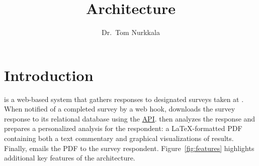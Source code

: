 \documentclass{article}
\title{\caper{} Architecture}
\author{Dr.\ Tom Nurkkala}
\begin{document}
\maketitle
\tableofcontents

\section{Introduction}
\label{sec:introduction}

\caper{} is a web-based system
that gathers responses to designated surveys taken at {\qual}.
When notified of a completed survey by a \qual{} web hook,
\caper{}
downloads the survey response
to its \pg{} relational database
using the
\qual{} \href{https://api.qualtrics.com/}{\rest{} API}.
\caper{} then
analyzes the response and
prepares a personalized analysis for the respondent:
a \LaTeX-formatted PDF containing both a text commentary
and graphical visualizations of results.
Finally, \caper{}
emails the PDF to the survey respondent.
Figure~\ref{fig:features} highlights additional
key features of the \caper{} architecture.
\end{document}
